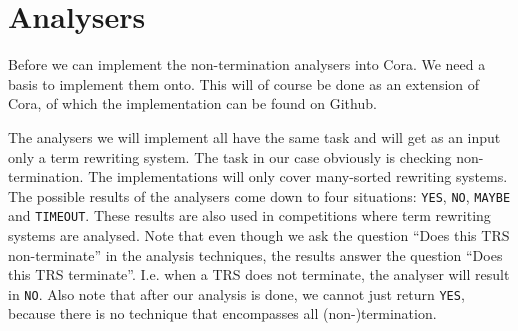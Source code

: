 \chapter{Analysers}\label{analysers}
Before we can implement the non-termination analysers into Cora. We need a basis to implement them onto. This will of course be done as an extension of Cora, of which the implementation can be found on Github.\cite{CoraFork2019}

The analysers we will implement all have the same task and will get as an input only a term rewriting system. The task in our case obviously is checking non-termination. The implementations will only cover many-sorted rewriting systems. The possible results of the analysers come down to four situations: \texttt{YES}, \texttt{NO}, \texttt{MAYBE} and \texttt{TIMEOUT}. These results are also used in competitions where term rewriting systems are analysed. Note that even though we ask the question ``Does this TRS non-terminate'' in the analysis techniques, the results answer the question ``Does this TRS terminate''. I.e. when a TRS does not terminate, the analyser will result in \texttt{NO}. Also note that after our analysis is done, we cannot just return \texttt{YES}, because there is no technique that encompasses all (non-)termination. 